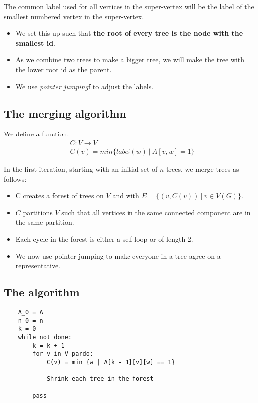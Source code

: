 The common label used for all vertices in the super-vertex will be the label
of the smallest numbered vertex in the super-vertex.

\begin{itemize}
\item We set this up such that \textbf{the root of every tree is the node with the smallest id}.
\item As we combine two trees to make a bigger tree, we will make the tree
with the lower root id as the parent.
\item We use \textit{pointer jumping}f to adjust the labels.
\end{itemize}


\subsection{The merging algorithm}
We define a function:
\begin{align*}
&C: V \to V \\
&C(v) = min \{ label(w)~\vert~A[v, w] = 1\}
\end{align*}

In the first iteration, starting with an initial set of $n$ trees, we merge
trees as follows:

\begin{itemize}
	\item C creates a forest of trees on $V$ and with $E = \{(v, C(v))~\vert~v \in V(G)\}$.
	\item $C$ partitions $V$ such that all vertices in the same connected component are in the same partition.
	\item Each cycle in the forest is either a self-loop or of length 2.
	\item We now use pointer jumping to make everyone in a tree agree on a representative.
\end{itemize}

\subsection{The algorithm}

\begin{verbatim}
	A_0 = A
	n_0 = n
	k = 0
	while not done:
		k = k + 1
		for v in V pardo:
			C(v) = min {w | A[k - 1][v][w] == 1}

			Shrink each tree in the forest

		pass
\end{verbatim}


